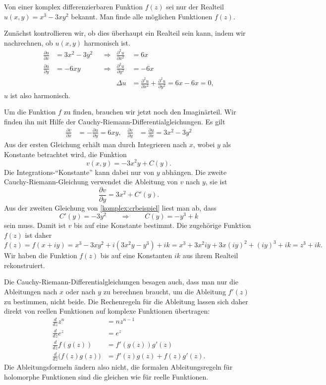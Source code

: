 \begin{beispiel}
Von einer komplex differenzierbaren Funktion $f(z)$ sei nur der Realteil
$u(x,y)=x^3 -3xy^2$ bekannt.
Man finde alle möglichen Funktionen $f(z)$.

Zunächst kontrollieren wir, ob dies überhaupt ein Realteil sein kann,
indem wir nachrechnen, ob $u(x,y)$ harmonisch ist.
\begin{equation*}
\begin{aligned}
\frac{\partial u}{\partial x}
&=
3x^2-3y^2
&&\Rightarrow&
\frac{\partial^2 u}{\partial x^2}
&=
6x
\\
\frac{\partial u}{\partial y}
&=
-6xy
&&\Rightarrow&
\frac{\partial^2 u}{\partial y^2}
&=
-6x
\\
&&&&\Delta u&=\frac{\partial^2u}{\partial x^2}+\frac{\partial^2u}{\partial y^2}=6x-6x=0,
\end{aligned}
\end{equation*}
$u$ ist also harmonisch.

Um die Funktion $f$ zu finden, brauchen wir jetzt noch den Imaginärteil.
Wir finden ihn mit Hilfe der Cauchy-Riemann-Differentialgleichungen.
Es gilt
\begin{equation}
\begin{aligned}
\frac{\partial v}{\partial x}
&=
-\frac{\partial u}{\partial y}=6xy,
&
\frac{\partial v}{\partial y}
&=
\frac{\partial u}{\partial x}=3x^2-3y^2
\end{aligned}
\label{komplex:crbeispiel}
\end{equation}
Aus der ersten Gleichung erhält man durch Integrieren nach $x$, wobei
$y$ als Konstante betrachtet wird, die Funktion
\[
v(x,y)=-3x^2y + C(y).
\]
Die Integrations-``Konstante'' kann dabei nur von $y$ abhängen.
Die zweite Cauchy-Riemann-Gleichung verwendet die Ableitung von $v$ nach $y$,
sie ist
\[
\frac{\partial v}{\partial y}=3x^2+C'(y).
\]
Aus der zweiten Gleichung von \eqref{komplex:crbeispiel} liest man
ab, dass
\[
C'(y)=-3y^2
\qquad\Rightarrow\qquad
C(y)=-y^3+k
\]
sein muss.
Damit ist $v$ bis auf eine Konstante bestimmt.
Die zugehörige Funktion $f(z)$ ist daher
\[
f(z)=f(x+iy)=x^3-3xy^2+i(3x^2y-y^3)+ik
=x^3 + 3x^2iy + 3x(iy)^2+(iy)^3+ik=z^3+ik.
\]
Wir haben die Funktion $f(z)$ bis auf eine Konstanten $ik$
aus ihrem Realteil rekonstruiert.
\end{beispiel}
Die Cauchy-Riemann-Differentialgleichungen besagen auch, dass man nur
die Ableitungen nach $x$ oder nach $y$ zu berechnen braucht,
um die Ableitung $f'(z)$ zu bestimmen, nicht beide.
Die Rechenregeln für die Ableitung lassen sich daher direkt von
reellen Funktionen auf komplexe Funktionen übertragen:
\begin{align*}
\frac{d}{dz}z^n
&=
nz^{n-1}
\\
\frac{d}{dz}e^z
&=
e^z
\\
\frac{d}{dz}f(g(z))
&=
f'(g(z)) g'(z)
\\
\frac{d}{dz}\bigl(f(z)g(z)\bigr)
&=
f'(z)g(z)+f(z)g'(z).
\end{align*}
Die Ableitungsformeln ändern also nicht, die formalen Ableitungsregeln
für holomorphe Funktionen sind die gleichen wie für reelle Funktionen.



